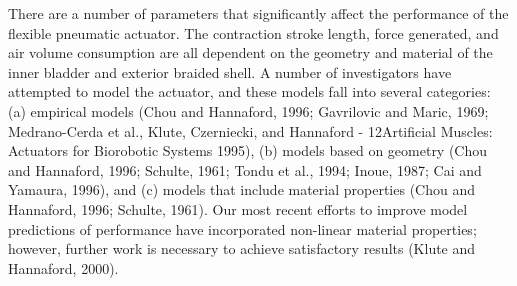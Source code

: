 \documentclass[main]{subfiles}
\begin{document}
There are a number of parameters that significantly affect the performance of the flexible pneumatic
actuator.
The contraction stroke length, force generated, and air volume consumption are all
dependent on the geometry and material of the inner bladder and exterior braided shell. A number of
investigators have attempted to model the actuator, and these models fall into several categories: (a)
empirical models (Chou and Hannaford, 1996; Gavrilovic and Maric, 1969; Medrano-Cerda et al.,
Klute, Czerniecki, and Hannaford - 12Artificial Muscles: Actuators for Biorobotic Systems
1995), (b) models based on geometry (Chou and Hannaford, 1996; Schulte, 1961; Tondu et al., 1994;
Inoue, 1987; Cai and Yamaura, 1996), and (c) models that include material properties (Chou and
Hannaford, 1996; Schulte, 1961).
Our most recent efforts to improve model predictions of
performance have incorporated non-linear material properties; however, further work is necessary to
achieve satisfactory results (Klute and Hannaford, 2000).
\scriptsize
\setlength{\LTleft}{-70pt}%
\setlength{\LTright}{\LTleft}
\end{document}
